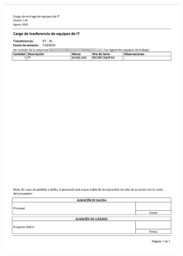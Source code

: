 \documentclass[stu, 12pt, letterpaper, donotrepeattitle, floatsintext, natbib]{apa7}
\begin{document}
\begin{figure}[h]
\begin{subfigure}[b]{0.3\textwidth}
        \includegraphics[width=\textwidth]{./images/reporteTransferencia.png}
    \end{subfigure}
\end{figure}

\newpage
\end{document}
